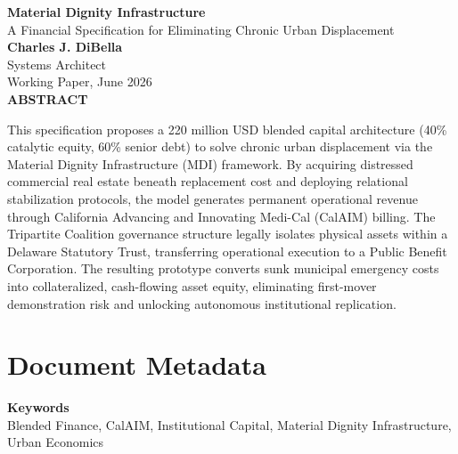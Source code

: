 \documentclass[12pt, letterpaper]{article}
\begin{document}
\captionsetup[table]{labelfont=normalfont, labelsep=period, skip=6pt}

\begin{titlepage}
\begin{center}
{\LARGE \textbf{Material Dignity Infrastructure}}\\[6pt]
{\large A Financial Specification for Eliminating Chronic Urban Displacement}\\[0.5cm]
{\normalsize \textbf{Charles J. DiBella}}\\[0.01cm]
{\normalsize Systems Architect}\\[0.01cm]
{\normalsize Working Paper, June 2026}\\[0.3cm]
\textbf{ABSTRACT}
\vspace{0.2cm}
\end{center}
\begin{minipage}{0.95\textwidth}
\noindent

This specification proposes a 220 million USD blended capital architecture (40\% catalytic equity, 60\% senior debt) to solve chronic urban displacement via the Material Dignity Infrastructure (MDI) framework. By acquiring distressed commercial real estate beneath replacement cost and deploying relational stabilization protocols, the model generates permanent operational revenue through California Advancing and Innovating Medi-Cal (CalAIM) billing. The Tripartite Coalition governance structure legally isolates physical assets within a Delaware Statutory Trust, transferring operational execution to a Public Benefit Corporation. The resulting prototype converts sunk municipal emergency costs into collateralized, cash-flowing asset equity, eliminating first-mover demonstration risk and unlocking autonomous institutional replication.

\end{minipage}
\end{titlepage}


\newpage
\section*{Document Metadata}

\noindent\textbf{Keywords}\\[1pt]
Blended Finance, CalAIM, Institutional Capital, Material Dignity Infrastructure, Urban Economics
\end{document}
